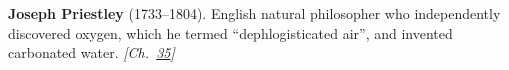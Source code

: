 \textbf{Joseph Priestley} (1733–1804). English natural philosopher who independently discovered oxygen, which he termed ``dephlogisticated air'', and invented carbonated water. \emph{[Ch.~\hyperref[ch:treesfromair]{35}]}

